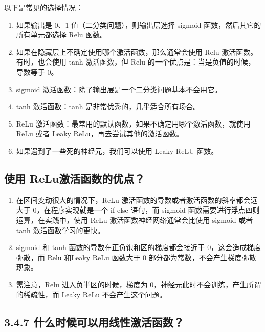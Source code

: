 以下是常见的选择情况：

\begin{enumerate}
\def\labelenumi{\arabic{enumi}.}
 
\item
  如果输出是 0、1 值（二分类问题），则输出层选择 sigmoid
  函数，然后其它的所有单元都选择 Relu 函数。
\item
  如果在隐藏层上不确定使用哪个激活函数，那么通常会使用 Relu
  激活函数。有时，也会使用 tanh 激活函数，但 Relu
  的一个优点是：当是负值的时候，导数等于 0。
\item
  sigmoid 激活函数：除了输出层是一个二分类问题基本不会用它。
\item
  tanh 激活函数：tanh 是非常优秀的，几乎适合所有场合。
\item
  ReLu 激活函数：最常用的默认函数，如果不确定用哪个激活函数，就使用 ReLu
  或者 Leaky ReLu，再去尝试其他的激活函数。
\item
  如果遇到了一些死的神经元，我们可以使用 Leaky ReLU 函数。
\end{enumerate}

\subsection{ 使用 ReLu激活函数的优点？}\label{ux4f7fux7528-relu-ux6fc0ux6d3bux51fdux6570ux7684ux4f18ux70b9}

\begin{enumerate}
\def\labelenumi{\arabic{enumi}.}
 
\item
  在区间变动很大的情况下，ReLu
  激活函数的导数或者激活函数的斜率都会远大于 0，在程序实现就是一个
  if-else 语句，而 sigmoid 函数需要进行浮点四则运算，在实践中，使用 ReLu
  激活函数神经网络通常会比使用 sigmoid 或者 tanh 激活函数学习的更快。
\item
  sigmoid 和 tanh 函数的导数在正负饱和区的梯度都会接近于
  0，这会造成梯度弥散，而 Relu 和Leaky ReLu 函数大于 0
  部分都为常数，不会产生梯度弥散现象。
\item
  需注意，Relu 进入负半区的时候，梯度为
  0，神经元此时不会训练，产生所谓的稀疏性，而 Leaky ReLu
  不会产生这个问题。
\end{enumerate}

\subsection{3.4.7
什么时候可以用线性激活函数？}\label{ux4ec0ux4e48ux65f6ux5019ux53efux4ee5ux7528ux7ebfux6027ux6fc0ux6d3bux51fdux6570}

